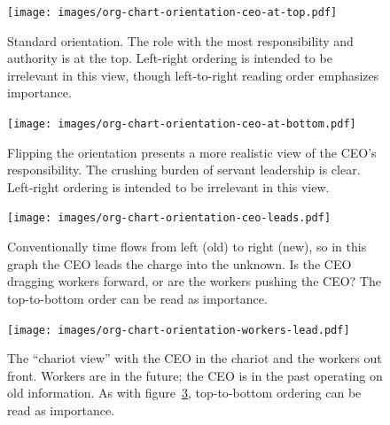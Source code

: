 \begin{figure}
\texttt{[image: images/org-chart-orientation-ceo-at-top.pdf]}
\caption{Standard orientation. The role with the most responsibility and authority is at the top. Left-right ordering is intended to be irrelevant in this view, though left-to-right reading order emphasizes importance.}
\label{fig:org_chart_orientation_ceo-at-top}
\end{figure}

\begin{figure}
\texttt{[image: images/org-chart-orientation-ceo-at-bottom.pdf]}
\caption{Flipping the orientation presents a more realistic view of the CEO's responsibility. The crushing burden of servant leadership is clear. Left-right ordering is intended to be irrelevant in this view.}
\label{fig:org_chart_orientation_ceo-at-bottom}
\end{figure}

\begin{figure}
\texttt{[image: images/org-chart-orientation-ceo-leads.pdf]}
\caption{Conventionally time flows from left (old) to right (new), so in this graph the CEO leads the charge into the unknown. Is the CEO dragging workers forward, or are the workers pushing the CEO? The top-to-bottom order can be read as importance. }
\label{fig:org_chart_orientation_ceo-leads}
\end{figure}

\begin{figure}
\texttt{[image: images/org-chart-orientation-workers-lead.pdf]}
\caption{The ``chariot view'' with the CEO in the chariot and the workers out front. Workers are in the future; the CEO is in the past operating on old information. As with figure~\ref{fig:org_chart_orientation_ceo-leads}, top-to-bottom ordering can be read as importance. }
\label{fig:org_chart_orientation_ceo-follows}
\end{figure}

